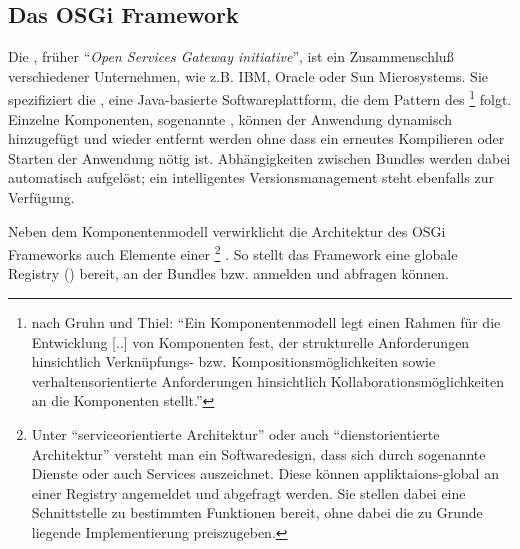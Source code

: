 \subsection{Das OSGi Framework}


Die , früher \enquote{\textit{Open Services Gateway
initiative}}, ist ein Zusammenschluß verschiedener Unternehmen, wie z.B. IBM,
Oracle oder Sun Microsystems.
Sie spezifiziert die , eine Java-basierte
Softwareplattform, die dem Pattern des 
\footnote{nach Gruhn und Thiel\citep{gruhn_komponentenmodelle_2000}:
\enquote{Ein Komponentenmodell legt einen Rahmen für die Entwicklung [..] von
Komponenten fest, der strukturelle Anforderungen hinsichtlich Verknüpfungs-
bzw. Kompositionsmöglichkeiten sowie verhaltensorientierte Anforderungen
hinsichtlich Kollaborationsmöglichkeiten an die Komponenten stellt.}}
folgt.
Einzelne Komponenten, sogenannte , können der Anwendung
dynamisch hinzugefügt und wieder entfernt werden ohne dass ein erneutes
Kompilieren oder Starten der Anwendung nötig ist.
Abhängigkeiten zwischen Bundles werden dabei automatisch aufgelöst; ein
intelligentes Versionsmanagement steht ebenfalls zur Verfügung.

Neben dem Komponentenmodell verwirklicht die Architektur des OSGi Frameworks
auch Elemente einer 
\footnote{Unter \enquote{serviceorientierte Architektur} oder auch
\enquote{dienstorientierte Architektur} versteht man ein Softwaredesign, dass
sich durch sogenannte Dienste oder auch Services auszeichnet. Diese können
appliktaions-global an einer Registry angemeldet und abgefragt werden.
Sie stellen dabei eine Schnittstelle zu bestimmten Funktionen bereit, ohne
dabei die zu Grunde liegende Implementierung preiszugeben.}
.
So stellt das Framework eine globale Registry ()
bereit, an der Bundles  bzw.  anmelden und
abfragen können.
\citep{wtherich_die_2008}

